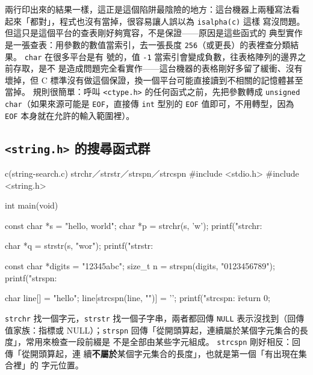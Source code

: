 
兩行印出來的結果一樣，這正是這個陷阱最陰險的地方：這台機器上兩種寫法看
起來「都對」，程式也沒有當掉，很容易讓人誤以為 \texttt{isalpha(c)} 這樣
寫沒問題。 但這只是這個平台的查表剛好夠寬容，不是保證——原因是這些函式的
典型實作是一張查表：用參數的數值當索引，去一張長度
\texttt{256}（或更長）的表裡查分類結果。 \texttt{char} 在很多平台是有
號的，值 \texttt{-1} 當索引會變成負數，往表格陣列的邊界之前存取，是不
是造成問題完全看實作——這台機器的表格剛好多留了緩衝、沒有壞掉，但 C
標準沒有做這個保證，換一個平台可能直接讀到不相關的記憶體甚至當掉。
規則很簡單：呼叫 \texttt{<ctype.h>} 的任何函式之前，先把參數轉成
\texttt{unsigned char}（如果來源可能是 \texttt{EOF}，直接傳
\texttt{int} 型別的 \texttt{EOF} 值即可，不用轉型，因為 \texttt{EOF}
本身就在允許的輸入範圍裡）。

\subsection{\texttt{<string.h>} 的搜尋函式群}

\begin{example}{c}{(string-search.c) strchr／strstr／strspn／strcspn}
#include <stdio.h>
#include <string.h>

int main(void) {
    const char *s = "hello, world";
    char *p = strchr(s, 'w');
    printf("strchr: %

    char *q = strstr(s, "wor");
    printf("strstr: %

    const char *digits = "12345abc";
    size_t n = strspn(digits, "0123456789");
    printf("strspn: %

    char line[] = "hello\n";
    line[strcspn(line, "\n")] = '\0';
    printf("strcspn: \"%
    return 0;
}
\end{example}


\texttt{strchr} 找一個字元，\texttt{strstr} 找一個子字串，兩者都回傳
\texttt{NULL} 表示沒找到（回傳值家族：指標或 NULL）；\texttt{strspn}
回傳「從開頭算起，連續屬於某個字元集合的長度」，常用來檢查一段前綴是
不是全部由某些字元組成。 \texttt{strcspn} 剛好相反：回傳「從開頭算起，連
續\textbf{不屬於}某個字元集合的長度」，也就是第一個「有出現在集合裡」的
字元位置。

